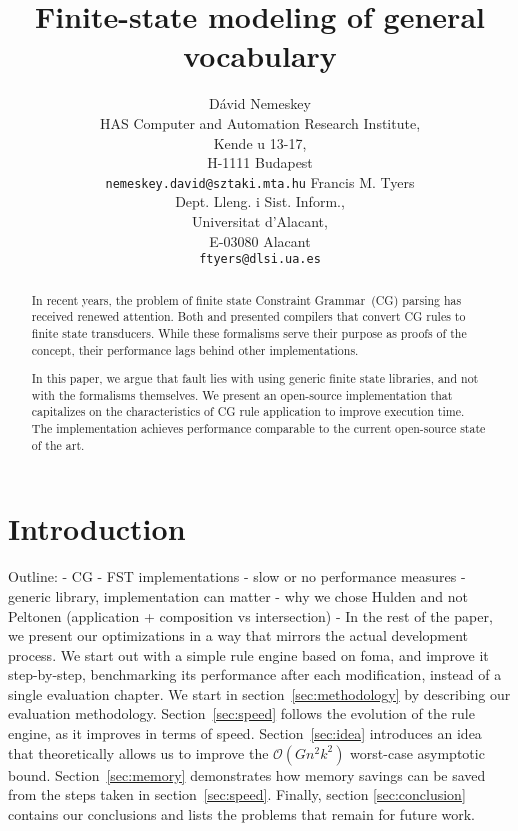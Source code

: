 \documentclass{article}
\title{Finite-state modeling of general vocabulary}
\author{D\'avid Nemeskey\\
 HAS Computer and Automation Research Institute, \\
   Kende u 13-17, \\
   H-1111 Budapest\\
 {\tt nemeskey.david@sztaki.mta.hu}
\And
Francis M. Tyers\\
Dept. Lleng. i Sist. Inform.,\\
Universitat d'Alacant,\\
E-03080 Alacant\\
{\tt ftyers@dlsi.ua.es}}
\date{}
\begin{document}
\maketitle\vspace*{-10mm}

\begin{abstract}
  In recent years, the problem of finite state Constraint Grammar~(CG) parsing has
  received renewed attention. Both  and
   presented compilers that convert CG rules to finite
  state transducers. While these formalisms serve their purpose as proofs of the
  concept, their performance lags behind other implementations.  %
  
  In this paper, we argue that fault lies with using generic finite state
  libraries, and not with the formalisms themselves. We present an open-source
  implementation that capitalizes on the characteristics of CG rule
  application to improve execution time. The implementation achieves performance
  comparable to the current open-source state of the art.
\end{abstract}

\section{Introduction}
Outline:
- CG
- FST implementations
- slow or no performance measures
- generic library, implementation can matter
- why we chose Hulden and not Peltonen (application + composition vs intersection)
- 
In the rest of the paper, we present our optimizations in a way that mirrors the
actual development process. We start out with a simple rule engine based on
foma, and improve it step-by-step, benchmarking its performance after each
modification, instead of a single evaluation chapter. We start in
section~\ref{sec:methodology} by describing our evaluation methodology.
Section~\ref{sec:speed} follows the evolution of the rule engine, as it improves
in terms of speed. Section~\ref{sec:idea} introduces an idea that theoretically
allows us to improve the $\mathcal{O}(Gn^2k^2)$ worst-case asymptotic bound.
Section~\ref{sec:memory} demonstrates how memory savings can be saved from the
steps taken in section~\ref{sec:speed}. Finally, section \ref{sec:conclusion}
contains our conclusions and lists the problems that remain for future work.
\end{document}
